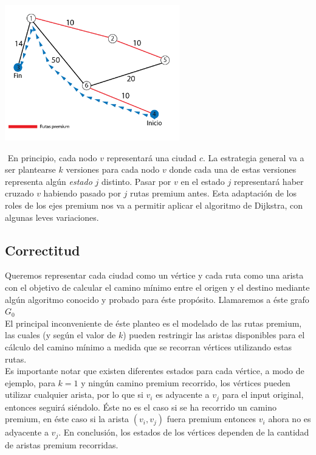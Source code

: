 {\centering
	\includegraphics[width=0.57\textwidth]{imagenes/problema1/problema1-c2-solved.png} \\
}

$ $ \newline
En principio, cada nodo $v$ representará una ciudad $c$. La estrategia general va a ser plantearse $k$ versiones para cada nodo $v$ donde cada una de estas versiones representa algún \textit{estado} $j$ distinto. Pasar por $v$ en el estado $j$ representará haber cruzado $v$ habiendo pasado por $j$ rutas premium antes. Esta adaptación de los roles de los ejes premium nos va a permitir aplicar el algoritmo de Dijkstra, con algunas leves variaciones.

\subsection{Correctitud}
Queremos representar cada ciudad como un vértice y cada ruta como una arista con el objetivo de calcular el camino mínimo entre el origen y el destino mediante algún algoritmo conocido y probado para éste propósito. Llamaremos a éste grafo $G_0$\\

El principal inconveniente de éste planteo es el modelado de las rutas premium, las cuales (y según el valor de $k$) pueden restringir las aristas disponibles para el cálculo del camino mínimo a medida que se recorran vértices utilizando estas rutas.\\

Es importante notar que existen diferentes estados para cada vértice, a modo de ejemplo, para $k=1$ y ningún camino premium recorrido, los vértices pueden utilizar cualquier arista, por lo que si $v_i$ es adyacente a $v_j$ para el input original, entonces seguirá siéndolo. Éste no es el caso si se ha recorrido un camino premium, en éste caso si la arista $(v_i, v_j)$ fuera premium entonces $v_i$ ahora no es adyacente a $v_j$. En conclusión, los estados de los vértices dependen de la cantidad de aristas premium recorridas.\\

